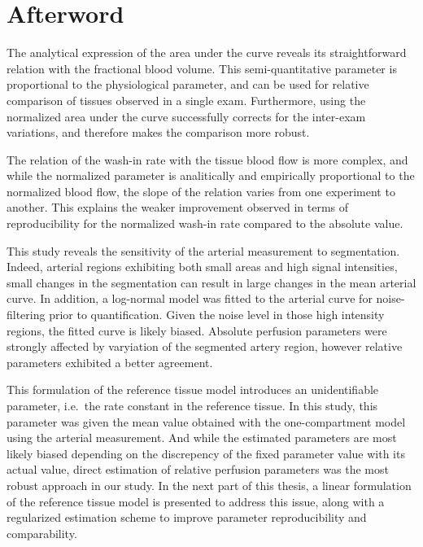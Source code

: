\chapter*{Afterword}
The analytical expression of the area under the curve reveals its straightforward relation with the fractional blood volume.
This semi-quantitative parameter is proportional to the physiological parameter, and can be used for relative comparison of tissues observed in a single exam.
Furthermore, using the normalized area under the curve successfully corrects for the inter-exam variations, and therefore makes the comparison more robust.

The relation of the wash-in rate with the tissue blood flow is more complex, and while the normalized parameter is analitically and empirically proportional to the normalized blood flow, the slope of the relation varies from one experiment to another.
This explains the weaker improvement observed in terms of reproducibility for the normalized wash-in rate compared to the absolute value.

This study reveals the sensitivity of the arterial measurement to segmentation.
Indeed, arterial regions exhibiting both small areas and high signal intensities, small changes in the segmentation can result in large changes in the mean arterial curve.
In addition, a log-normal model was fitted to the arterial curve for noise-filtering prior to quantification.
Given the noise level in those high intensity regions, the fitted curve is likely biased.
Absolute perfusion parameters were strongly affected by varyiation of the segmented artery region, however relative parameters exhibited a better agreement.

This formulation of the reference tissue model introduces an unidentifiable parameter, i.e.~the rate constant in the reference tissue.
In this study, this parameter was given the mean value obtained with the one-compartment model using the arterial measurement.
And while the estimated parameters are most likely biased depending on the discrepency of the fixed parameter value with its actual value, direct estimation of relative perfusion parameters was the most robust approach in our study.
In the next part of this thesis, a linear formulation of the reference tissue model is presented to address this issue, along with a regularized estimation scheme to improve parameter reproducibility and comparability.